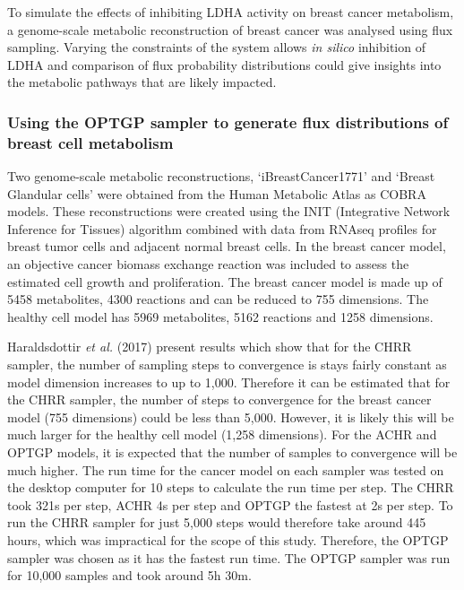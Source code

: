 \documentclass[10pt,letterpaper]{article}
\begin{document}
To simulate the effects of inhibiting LDHA activity on breast cancer metabolism, a genome-scale metabolic reconstruction of breast cancer was analysed using flux sampling. Varying the constraints of the system allows \textit{in silico} inhibition of LDHA and comparison of flux probability distributions could give insights into the metabolic pathways that are likely impacted.  

\subsubsection*{Using the OPTGP sampler to generate flux distributions of breast cell metabolism}
Two genome-scale metabolic reconstructions, ‘iBreastCancer1771’ and ‘Breast Glandular cells’ were obtained from the Human Metabolic Atlas as COBRA models\cite{metatlas}\cite{Gatto}. These reconstructions were created using the INIT (Integrative Network Inference for Tissues\cite{Argen}) algorithm combined with data from RNAseq profiles for breast tumor cells and adjacent normal breast cells\cite{Gatto}. In the breast cancer model, an objective cancer biomass exchange reaction was included to assess the estimated cell growth and proliferation. The breast cancer model is made up of 5458 metabolites, 4300 reactions and can be reduced to 755 dimensions. The healthy cell model has 5969 metabolites, 5162 reactions and 1258 dimensions.

Haraldsdottir \textit{et al.} (2017) present results which show that for the CHRR sampler, the number of sampling steps to convergence is stays fairly constant as model dimension increases to up to 1,000\cite{Haraldsdottir}. Therefore it can be estimated that for the CHRR sampler, the number of steps to convergence for the breast cancer model (755 dimensions) could be less than 5,000. However, it is likely this will be much larger for the healthy cell model (1,258 dimensions). For the ACHR and OPTGP models, it is expected that the number of samples to convergence will be much higher. The run time for the cancer model on each sampler was tested on the desktop computer for 10 steps to calculate the run time per step. The CHRR took 321s per step, ACHR 4s per step and OPTGP the fastest at 2s per step. To run the CHRR sampler for just 5,000 steps would therefore take around 445 hours, which was impractical for the scope of this study. Therefore, the OPTGP sampler was chosen as it has the fastest run time. The OPTGP sampler was run for 10,000 samples and took around 5h 30m.
\end{document}
